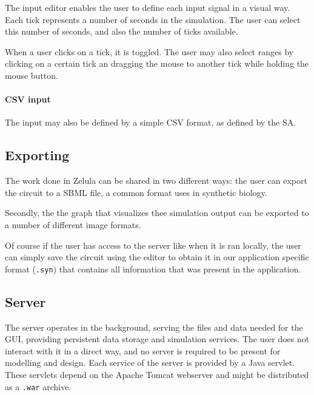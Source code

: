 \noindent The input editor enables the user to define each input signal in a visual way. Each tick represents a number of seconds in the simulation. The user can select this number of seconds, and also the number of ticks available.

When a user clicks on a tick, it is toggled. The user may also select ranges by clicking on a certain tick an dragging the mouse to another tick while holding the mouse button.

\paragraph{CSV input}
\begin{figure}[h!]
\centering{}
\end{figure}

\noindent The input may also be defined by a simple CSV format, as defined by the SA.

\subsection{Exporting}
The work done in Zelula can be shared in two different ways: the user can export the circuit to a SBML file, a common format uses in synthetic biology.

Secondly, the the graph that visualizes thee simulation output can be exported to a number of different image formats.

Of course if the user has access to the server like when it is ran locally, the user can simply save the circuit using the editor to obtain it in our application specific format (\verb=.syn=) that contains all information that was present in the application.

\subsection{Server}
The server operates in the background, serving the files and data needed for the GUI, providing persistent data storage and simulation services. The user does not interact with it in a direct way, and no server is required to be present for modelling and design. Each service of the server is provided by a Java servlet. These servlets depend on the Apache Tomcat webserver and might be distributed as a \verb|.war| archive. 
